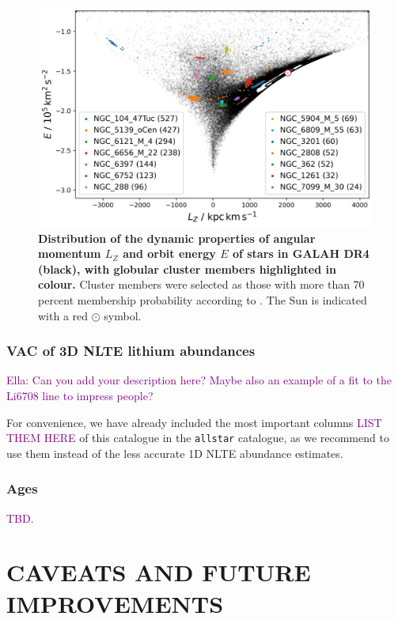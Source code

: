 \documentclass[
  journal=pasa,
  manuscript=research-paper, %
  year=2024,
  volume=37
]{cup-journal}
\newcommand{\SB}[1]{{\textcolor{purple}{#1}}}
\begin{document}
\begin{figure}
\includegraphics[width=\columnwidth]{figures/galah_dr4_lz_e_with_gcs.png}
\caption{
\textbf{Distribution of the dynamic properties of angular momentum $L_Z$ and orbit energy $E$ of stars in GALAH DR4 (black), with globular cluster members highlighted in colour.} Cluster members were selected as those with more than 70 percent membership probability according to \citet{Vasiliev2021}. The Sun is indicated with a red $\odot$ symbol.
}
\label{fig:galah_dr4_lz_e_with_gcs}
\end{figure}

\subsubsection{VAC of 3D NLTE lithium abundances}

\SB{Ella: Can you add your description here? Maybe also an example of a fit to the Li6708 line to impress people?}

For convenience, we have already included the most important columns \SB{LIST THEM HERE} of this catalogue in the \texttt{allstar} catalogue, as we recommend to use them instead of the less accurate 1D NLTE abundance estimates.

\subsubsection{Ages}

\SB{TBD.}

\section{CAVEATS AND FUTURE IMPROVEMENTS} \label{sec:caveats}
\end{document}
